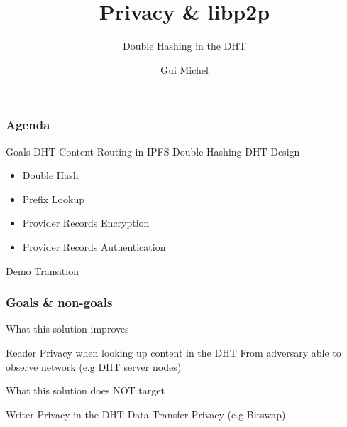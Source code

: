 \documentclass{pl-slide}
\title{Privacy \& libp2p}
\subtitle{Double Hashing in the DHT}
\author{Gui Michel}
\institute{Protocol Labs}
\date{\DTMdate{2022-10-30}}
\begin{document}
\frame{\titlepage}

\begin{frame}
\frametitle{Agenda}
\begin{itemize}
	\itemc Goals
	\itemc DHT Content Routing in IPFS
	\itemc Double Hashing DHT Design
	\begin{itemize}
		\item[\greencube] Double Hash
		\item[\greencube] Prefix Lookup
		\item[\greencube] Provider Records Encryption
		\item[\greencube] Provider Records Authentication
	\end{itemize}
	\itemc Demo
	\itemc Transition
\end{itemize}
\end{frame}

\begin{frame}
\frametitle{Goals \& non-goals}

{\Large What this solution improves}
\begin{itemize}
	\itemc Reader Privacy when looking up content in the DHT
	\itemc From adversary able to observe network (e.g DHT server nodes)
\end{itemize}
\bigskip

{\Large What this solution does NOT target}
\begin{itemize}
	\itemc Writer Privacy in the DHT
	\itemc Data Transfer Privacy (e.g Bitswap)
\end{itemize}
\end{frame}
\end{document}
